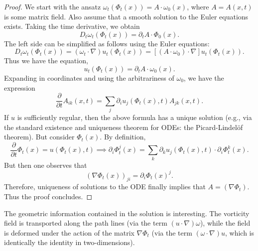 \documentclass{article}
\begin{document}
\begin{proof}
	We start with the ansatz $\omega_{t}(\Phi_{t}(x)) = A \cdot \omega_{0}(x)$, where $A = A(x, t)$ is some matrix field. Also assume that a smooth solution to the Euler equations exists. Taking the time derivative, we obtain 
	\begin{equation*}
		D_{t}\omega_{t}(\Phi_{t}(x)) = \partial_{t}A \cdot \Phi_{0}(x). 
	\end{equation*}
	The left side can be simplified as follows using the Euler equations: 
	\begin{equation*}
		D_{t}\omega_{t}(\Phi_{t}(x)) = (\omega_{t}\cdot \nabla)u_{t}(\Phi_{t}(x)) = [(A \cdot \omega_{0}) \cdot \nabla]u_{t}(\Phi_{t}(x)). 
	\end{equation*}
	Thus we have the equation, 
	\begin{equation*}
		[(A \cdot \omega_{0}) \cdot \nabla]u_{t}(\Phi_{t}(x))=\partial_{t}A\cdot \omega_{0}(x).
	\end{equation*} 
	Expanding in coordinates and using the arbitrariness of $\omega_{0}$, we have the expression 
	\begin{equation*}
		\frac{\partial}{\partial t}A_{ik}(x, t) = \sum_{j}\partial_{i}u_{j}(\Phi_{t}(x), t)A_{jk}(x,t). 
	\end{equation*} 
	If $u$ is sufficiently regular, then the above formula has a unique solution (e.g., via the standard existence and uniqueness theorem for ODEs: the Picard-Lindel\"of theorem). But consider $\Phi_{t}(x)$. By definition, 
	\begin{equation*}
		\frac{\partial}{\partial t}\Phi_{t}(x) = u(\Phi_{t}(x), t) \implies \partial_{i}\Phi_{t}^{j}(x) = \sum_{k}\partial_{k}u_{j}(\Phi_{t}(x),t) \cdot \partial_{i}\Phi^{k}_{t}(x). 
	\end{equation*}
	But then one observes that 
	\begin{equation*}
		(\nabla \Phi_{t}(x))_{ji} = \partial_{i}\Phi_{t}(x)^{j}. 
	\end{equation*} 
	Therefore, uniqueness of solutions to the ODE finally implies that $A = (\nabla \Phi_{t})$. Thus the proof concludes. 
\end{proof} 
The geometric information contained in the solution is interesting. The vorticity field is transported along the path lines (via the term $(u \cdot \nabla)\omega$), while the field is deformed under the action of the matrix $\nabla \Phi_{t}$ (via the term $(\omega \cdot \nabla)u$, which is identically the identity in two-dimensions). 
\end{document}

